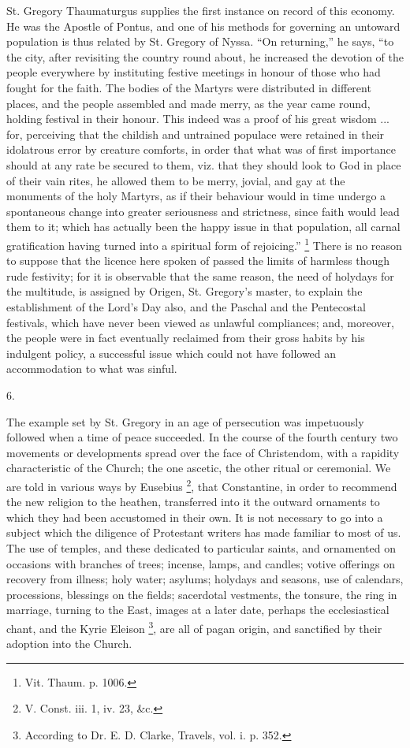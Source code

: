 St. Gregory Thaumaturgus supplies the first instance
on record of this economy. He was the Apostle of Pontus,
and one of his methods for governing an untoward
population is thus related by St. Gregory of Nyssa.
``On returning,'' he says, ``to the city,
after revisiting the country round about, he increased
the devotion of the people everywhere by instituting
festive meetings in honour of those who had fought for
the faith. The bodies of the Martyrs were distributed in
different places, and the people assembled and made
merry, as the year came round, holding festival in their
honour. This indeed was a proof of his great wisdom ...
for, perceiving that the childish and untrained populace
were retained in their idolatrous error by creature
comforts, in order that what was of first importance
should at any rate be secured to them, viz. that they
should look to God in place of their vain rites, he
allowed them to be merry, jovial, and gay at the
monuments of the holy Martyrs, as if their behaviour
would in time undergo a spontaneous change into greater
seriousness and strictness, since faith would lead them
to it; which has actually been the happy issue in that
population, all carnal gratification having turned into a
spiritual form of rejoicing.'' \footnote{Vit. Thaum. p. 1006.} There is no reason to
suppose that the licence here spoken of passed the
limits of harmless though rude festivity; for it is
observable that the same reason, the need of holydays for
the multitude, is assigned by Origen, St. Gregory's
master, to explain the establishment of the Lord's Day
also, and the Paschal and the Pentecostal festivals,
which have never been viewed as unlawful compliances;
and, moreover, the people were in fact eventually
reclaimed from their gross habits by his indulgent
policy, a successful issue which could not have followed
an accommodation to what was sinful.

6.

The example set by St. Gregory in an age of
persecution was impetuously followed when a time of peace
succeeded. In the course of the fourth century two
movements or developments spread over the face of
Christendom, with a rapidity characteristic of the
Church; the one ascetic, the other ritual or ceremonial.
We are told in various ways by Eusebius \footnote{V. Const. iii. 1, iv. 23,
\&c.}, that
Constantine, in order to recommend the new religion to
the heathen, transferred into it the outward ornaments to
which they had been accustomed in their own. It is not
necessary to go into a subject which the diligence of
Protestant writers has made familiar to most of us. The
use of temples, and these dedicated to particular saints,
and ornamented on occasions with branches of trees;
incense, lamps, and candles; votive offerings on recovery
from illness; holy water; asylums; holydays and seasons,
use of calendars, processions, blessings on the fields;
sacerdotal vestments, the tonsure, the ring in marriage,
turning to the East, images at a later date, perhaps the
ecclesiastical chant, and the Kyrie Eleison \footnote{According to Dr. E. D.
Clarke, Travels, vol. i. p. 352.}, are all of
pagan origin, and sanctified by their adoption into the
Church.

